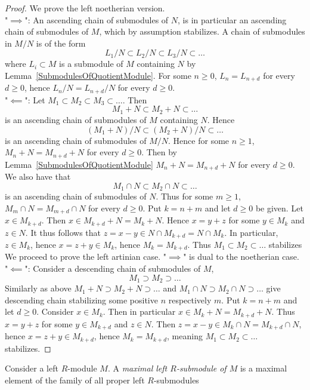 \begin{proof}
    We prove the left noetherian version.\\
    "$\implies$": An ascending chain of submodules of $N$, is in particular an ascending chain of submodules of $M$, which by assumption stabilizes. A chain of submodules in $M/N$ is of the form 
    $$L_1/N\subset L_2/N\subset L_3/N \subset\dots$$
    where $L_i\subset M$ is a submodule of $M$ containing $N$ by Lemma~\ref{SubmodulesOfQuotientModule}. For some $n\geq 0$, $L_n = L_{n+d}$ for every $d\geq 0$, hence $L_n/N = L_{n+d}/N$ for every $d\geq 0$.\\
    "$\impliedby$": Let $M_1\subset M_2\subset M_3\subset \dots $. Then 
    $$M_1+N\subset M_2 + N\subset \dots $$
    is an ascending chain of submodules of $M$ containing $N$. Hence 
    $$(M_1+N)/N \subset (M_2+N)/N \subset \dots$$
    is an ascending chain of submodules of $M/N$. Hence for some $n\geq 1$, $M_{n}+N=M_{n+d}+N$ for every $d\geq 0$. Then by Lemma~\ref{SubmodulesOfQuotientModule} $M_n+N =M_{n+d} +N$ for every $d\geq 0$. We also have that 
    $$M_1\cap N \subset M_2\cap N\subset \dots$$
    is an ascending chain of submodules of $N$. Thus for some $m\geq 1$, $M_m \cap N = M_{m+d} \cap N$ for every $d\geq 0$. Put $k = n+m$ and let $d\geq 0$ be given. Let $x\in M_{k+d}$. Then $x \in M_{k+d}+N = M_k+N$. Hence $x = y+z$ for some $y\in M_k$ and $z \in N$. It thus follows that $z = x-y \in N\cap M_{k+d} = N \cap M_k$. In particular, $z \in M_k$, hence $x = z+y \in M_k$, hence $M_k = M_{k+d}$. Thus $M_1\subset M_2\subset \dots$ stabilizes\\
    We proceed to prove the left artinian case. "$\implies$" is dual to the noetherian case.\\
    "$\impliedby$": Consider a descending chain of submodules of $M$,
    $$M_1\supset M_2\supset\dots $$
    Similarly as above $M_1+N\supset M_2+N \supset \dots$ and $M_1\cap N \supset M_2\cap N\supset \dots$ give descending chain stabilizing some positive $n$ respectively $m$. Put $k=n+m$ and let $d\geq 0$. Consider $x\in M_k$. Then in particular $x \in M_k + N = M_{k+d} + N$. Thus $x = y+z$ for some $y\in M_{k+d}$ and $z\in N$. Then $z = x-y \in M_k \cap N =M_{k+d}\cap N$, hence $x =z+y \in M_{k+d}$, hence $M_k = M_{k+d}$, meaning $M_1\subset M_2\subset \dots$ stabilizes. 
\end{proof}
\begin{definition}
    Consider a left $R$-module $M$. A \emph{maximal left $R$-submodule of $M$} is a maximal element of the family of all proper left $R$-submodules   
\end{definition}

